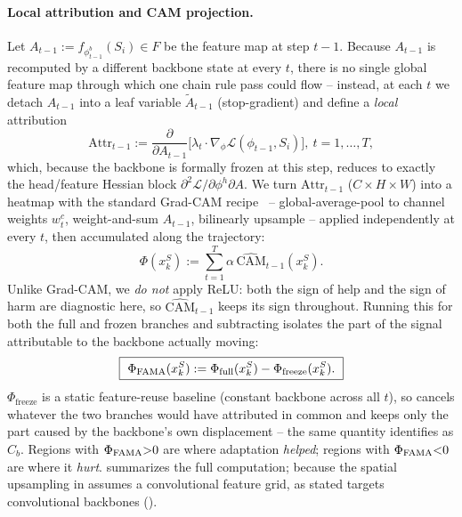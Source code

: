 \paragraph{Local attribution and CAM projection.}
Let $A_{t-1}:=f_{\phi_{t-1}^b}(S_i)\in F$ be the feature map at step $t{-}1$. Because $A_{t-1}$ is recomputed by a different backbone state at every $t$, there is no single global feature map through which one chain rule pass could flow -- instead, at each $t$ we detach $A_{t-1}$ into a leaf variable $\tilde A_{t-1}$ (stop-gradient) and define a \emph{local} attribution
\begin{equation}
    \mathrm{Attr}_{t-1} := \frac{\partial}{\partial A_{t-1}}\Big[\lambda_t\!\cdot\!\nabla_\phi\mathcal{L}(\phi_{t-1},S_i)\Big],\ t=1,\dots,T,
    \label{eq:local_attr}
\end{equation}
which, because the backbone is formally frozen at this step, reduces to exactly the head/feature Hessian block $\partial^2\mathcal{L}/\partial\phi^h\partial A$. We turn $\mathrm{Attr}_{t-1}$ ($C\times H\times W$) into a heatmap with the standard Grad-CAM recipe~\cite{selvaraju2020grad} -- global-average-pool to channel weights $w_t^c$, weight-and-sum $A_{t-1}$, bilinearly upsample -- applied independently at every $t$, then accumulated along the trajectory:
\begin{equation}
    \Phi(x_k^S) := \sum_{t=1}^{T}\alpha\,\widehat{\mathrm{CAM}}_{t-1}(x_k^S).
    \label{eq:branch_saliency}
\end{equation}
Unlike Grad-CAM, we \emph{do not} apply ReLU: both the sign of help and the sign of harm are diagnostic here, so $\widehat{\mathrm{CAM}}_{t-1}$ keeps its sign throughout. Running this for both the full and frozen branches and subtracting isolates the part of the signal attributable to the backbone actually moving:
\begin{equation}
    \boxed{\ \PhiFama(x_k^S) := \Phi_{\mathrm{full}}(x_k^S) - \Phi_{\mathrm{freeze}}(x_k^S).\ }
    \label{eq:fama_final}
\end{equation}
$\Phi_{\mathrm{freeze}}$ is a static feature-reuse baseline (constant backbone across all $t$), so  cancels whatever the two branches would have attributed in common and keeps only the part caused by the backbone's own displacement -- the same quantity  identifies as $C_b$. Regions with $\Phi_{\mathrm{FAMA}}{>}0$ are where adaptation \emph{helped}; regions with $\Phi_{\mathrm{FAMA}}{<}0$ are where it \emph{hurt}.  summarizes the full computation; because the spatial upsampling in  assumes a convolutional feature grid, \fama as stated targets convolutional backbones ().


